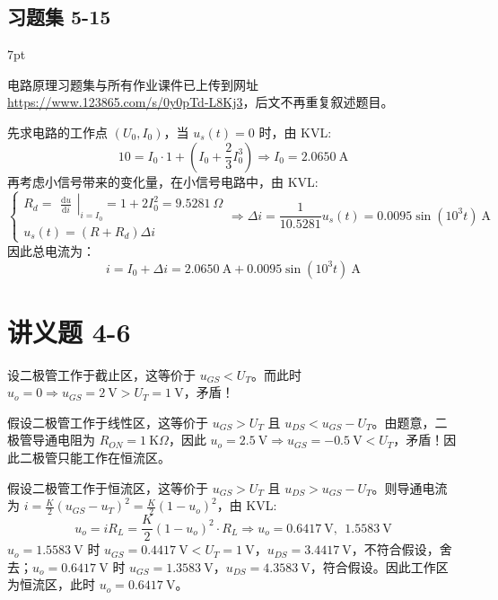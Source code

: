 \documentclass[UTF8]{report}
\def\kO{\ \mathrm{K}\Omega}
\theoremstyle{MyLineTheoremStyle} %
\theoremstyle{MyBlockTheoremStyle} %
\theoremstyle{MySubsubsectionStyle} %
\newenvironment{graybox}{%
        \def\FrameCommand{%
        \hspace{1pt}%
        {\color{gray}\small \vrule width 2pt}%
        {\color{graybox_color}\vrule width 4pt}%
        \colorbox{graybox_color}%
        }%
        \MakeFramed{\advance\hsize-\width\FrameRestore}%
        \noindent\hspace{-4.55pt}%
        \begin{adjustwidth}{}{7pt}%
        \vspace{2pt}\vspace{2pt}%
        }
        {%
        \vspace{2pt}\end{adjustwidth}\endMakeFramed%
        }
\begin{document}
\subsection{习题集 5-15}\vspace*{-4mm}
\begin{graybox}
电路原理习题集与所有作业课件已上传到网址 \href{https://www.123865.com/s/0y0pTd-L8Kj3}{https://www.123865.com/s/0y0pTd-L8Kj3}，后文不再重复叙述题目。
\end{graybox}

先求电路的工作点 $(U_0, I_0)$，当 $u_s(t) = 0$ 时，由 KVL:
\begin{equation}
10 = I_0\cdot 1 + \left(I_0 + \frac{2}{3}I_0^3\right) \Longrightarrow I_0 = 2.0650 \ \mathrm{A}
\end{equation}
再考虑小信号带来的变化量，在小信号电路中，由 KVL:
\begin{equation}
\begin{cases}
R_d = 
\left.\begin{matrix}
    \frac{\mathrm{d} u }{\mathrm{d} i } 
\end{matrix}\right|_{i = I_0} = 1+2I_0^2 =  9.5281 \ \Omega \\
u_s(t) = (R + R_d)\Delta i
\end{cases}\Longrightarrow 
\Delta i = \frac{1}{10.5281}u_s(t) = 0.0095 \sin (10^3 t) \ \mathrm{A}
\end{equation}
因此总电流为：
\begin{equation}
i = I_0 + \Delta i = 2.0650 \ \mathrm{A} + 0.0095 \sin (10^3 t) \ \mathrm{A}
\end{equation}

\section{讲义题 4-6}\label{讲义题 4-6}
设二极管工作于截止区，这等价于 $u_{GS} < U_T$。而此时 $u_o = 0 \Longrightarrow u_{GS} = 2 \ \mathrm{V} > U_T = 1 \ \mathrm{V}$，矛盾！

假设二极管工作于线性区，这等价于 $u_{GS} > U_T$ 且 $u_{DS} < u_{GS} - U_T$。由题意，二极管导通电阻为 $R_{ON} = 1 \kO$，因此 $u_o = 2.5 \ \mathrm{V} \Longrightarrow u_{GS} = -0.5 \ \mathrm{V} < U_T$，矛盾！因此二极管只能工作在恒流区。

假设二极管工作于恒流区，这等价于 $u_{GS} > U_T$ 且 $u_{DS} > u_{GS} - U_T$。则导通电流为 $i = \frac{K}{2}\left(u_{GS} - u_{T}\right)^2 = \frac{K}{2}\left(1-u_o\right)^2$，由 KVL:
\begin{equation}
u_o = iR_L =  \frac{K}{2}\left(1-u_o\right)^2\cdot R_L\Longrightarrow u_o = 0.6417 \ \mathrm{V},\ \ 1.5583 \ \mathrm{V}
\end{equation}
$u_o = 1.5583 \ \mathrm{V}$ 时 $u_{GS} = 0.4417\ \mathrm{V} < U_T = 1 \ \mathrm{V}$，$u_{DS} = 3.4417 \ \mathrm{V}$，不符合假设，舍去；$u_o = 0.6417 \ \mathrm{V}$ 时 $u_{GS} = 1.3583\ \mathrm{V}$，$u_{DS} = 4.3583 \ \mathrm{V}$，符合假设。因此工作区为恒流区，此时 $u_o = 0.6417 \ \mathrm{V}$。
\end{document}
